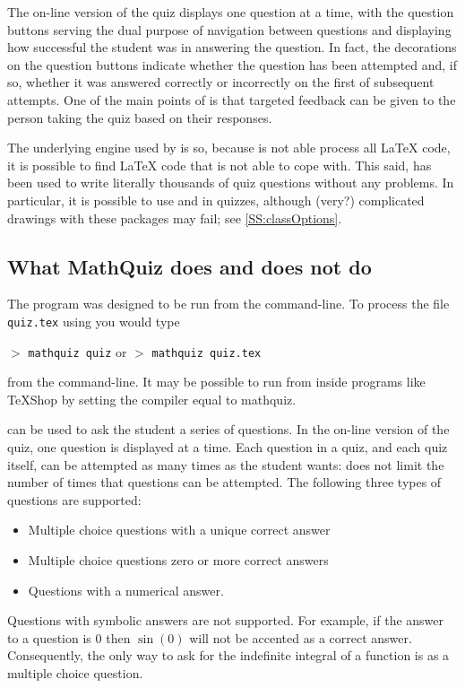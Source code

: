 \documentclass[svgnames]{article}
\begin{document}
    The on-line version of the quiz displays one question at a time,
    with the question buttons serving the dual purpose of navigation
    between questions and displaying how successful the student was
    in answering the question. In fact, the decorations on the question
    buttons indicate whether the question has been attempted and, if so,
    whether it was answered correctly or incorrectly on the first of
    subsequent attempts. One of the main points of \MathQuiz is that
    targeted feedback can be given to the person taking the quiz based
    on their responses.

    The underlying engine used by \MathQuiz is  so, because
     is not able process all \LaTeX{} code, it is possible to
    find \LaTeX{} code that \MathQuiz is not able to cope with.
    This said, \MathQuiz has been used to write literally thousands of quiz
    questions without any problems. In particular, it is possible to use
     and  in \MathQuiz quizzes, although
    (very?) complicated drawings with these packages may fail; see
    \autoref{SS:classOptions}.

\subsection{What MathQuiz does and does not do}

    The \MathQuiz program was designed to be run from the command-line.
    To process the file \texttt{quiz.tex} using \MathQuiz you would
    type

    $>$ \Verb|mathquiz quiz| \qquad or \qquad $>$ \Verb|mathquiz quiz.tex|

    \noindent from the command-line. It may be possible to run \MathQuiz
    from inside programs like \TeX Shop by setting the compiler equal to
    \textsf{mathquiz}.

    \MathQuiz can be used to ask the student a series of questions. In
    the on-line version of the quiz, one question is displayed at a
    time. Each question in a quiz, and each quiz itself, can be
    attempted as many times as the student wants: \MathQuiz does not
    limit the number of times that questions can be attempted.
    The following three types of questions are supported:
    \begin{itemize}
      \item Multiple choice questions with a unique correct answer
      \item Multiple choice questions zero or more correct answers
      \item Questions with a numerical answer.
    \end{itemize}
    Questions with symbolic answers are not supported.
    For example, if the answer to a question is $0$ then $\sin(0)$ will
    not be accented as a correct answer. Consequently, the only way to ask for the
    indefinite integral of a function is as a multiple choice question.
\end{document}
